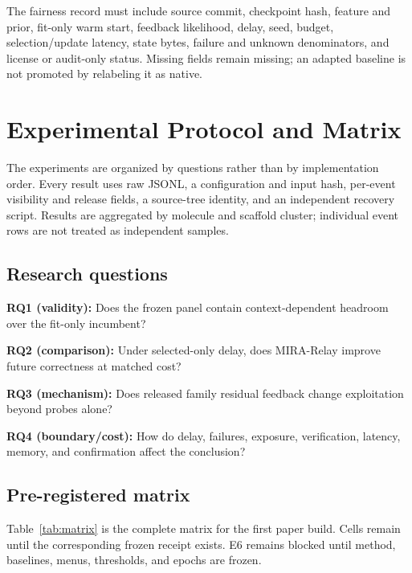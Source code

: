 \documentclass[sigconf,anonymous]{aamas}
\newcommand{\tbd}{\text{TBD}}
\begin{document}
The fairness record must include source commit, checkpoint hash, feature and prior, fit-only warm start, feedback likelihood, delay, seed, budget, selection/update latency, state bytes, failure and unknown denominators, and license or audit-only status. Missing fields remain missing; an adapted baseline is not promoted by relabeling it as native.

\section{Experimental Protocol and Matrix}
The experiments are organized by questions rather than by implementation order. Every result uses raw JSONL, a configuration and input hash, per-event visibility and release fields, a source-tree identity, and an independent recovery script. Results are aggregated by molecule and scaffold cluster; individual event rows are not treated as independent samples.

\subsection{Research questions}
\textbf{RQ1 (validity):} Does the frozen panel contain context-dependent headroom over the fit-only incumbent?\par
\textbf{RQ2 (comparison):} Under selected-only delay, does MIRA-Relay improve future correctness at matched cost?\par
\textbf{RQ3 (mechanism):} Does released family residual feedback change exploitation beyond probes alone?\par
\textbf{RQ4 (boundary/cost):} How do delay, failures, exposure, verification, latency, memory, and confirmation affect the conclusion?

\subsection{Pre-registered matrix}
Table~\ref{tab:matrix} is the complete matrix for the first paper build. Cells remain \tbd{} until the corresponding frozen receipt exists. E6 remains blocked until method, baselines, menus, thresholds, and epochs are frozen.
\end{document}

